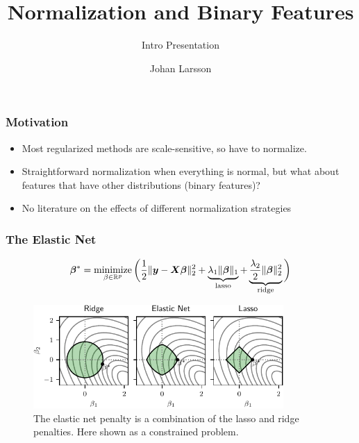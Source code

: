 \documentclass[10pt]{beamer}
\title{Normalization and Binary Features}
\subtitle{Intro Presentation}
\author{Johan Larsson}
\institute{Department of Mathemathical Sciences, University of Copenhagen}
\begin{document}
\maketitle

%

\begin{frame}[c]
  \frametitle{Motivation}

  \begin{itemize}[<+->]
    \item Most regularized methods are scale-sensitive, so have to normalize.
    \item Straightforward normalization when everything is normal, but what about features that have
          other distributions (binary features)?
    \item No literature on the effects of different normalization strategies
  \end{itemize}
\end{frame}

\begin{frame}[c]
  \frametitle{The Elastic Net}

  \begin{equation*}
    \bm{\beta}^* = \operatorname*{minimize}_{\beta \in \mathbb{R}^p} \bigg( \frac{1}{2} \lVert \bm{y} - \bm{X}\bm{\beta} \rVert^2_2  + \underbrace{\lambda_1 \lVert \bm{\beta} \rVert_1}_\text{lasso} + \underbrace{\frac{\lambda_2}{2}\lVert \bm{\beta} \rVert_2^2}_\text{ridge}\bigg)
  \end{equation*}

  \pause

  \begin{figure}
    \centering
    \includegraphics[width=0.85\textwidth]{images/paper6-elasticnet-balls.pdf}
    \caption{%
      The elastic net penalty is a combination of the lasso and ridge penalties. Here shown as a constrained problem.
    }
  \end{figure}
\end{frame}
\end{document}
